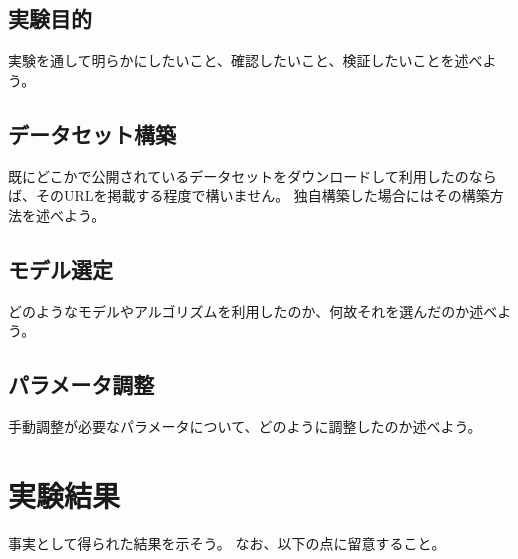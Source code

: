 \documentclass[a4paper, 11pt, titlepage]{jsarticle}
\begin{document}
\subsection{実験目的}
実験を通して明らかにしたいこと、確認したいこと、検証したいことを述べよう。

\subsection{データセット構築}
既にどこかで公開されているデータセットをダウンロードして利用したのならば、そのURLを掲載する程度で構いません。
独自構築した場合にはその構築方法を述べよう。

\subsection{モデル選定}
どのようなモデルやアルゴリズムを利用したのか、何故それを選んだのか述べよう。

\subsection{パラメータ調整}
手動調整が必要なパラメータについて、どのように調整したのか述べよう。


\section{実験結果}
事実として得られた結果を示そう。
なお、以下の点に留意すること。
\end{document}
